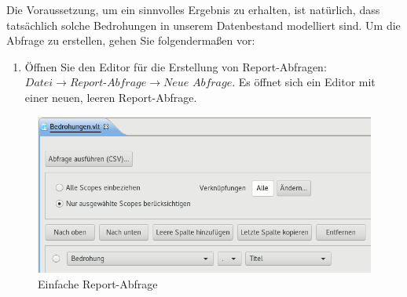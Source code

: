 \documentclass[a4paper,10pt]{book}
\providecommand{\tightlist}{%
  \setlength{\itemsep}{0pt}\setlength{\parskip}{0pt}}
\begin{document}
Die Voraussetzung, um ein sinnvolles Ergebnis zu erhalten, ist natürlich, dass
tatsächlich solche Bedrohungen in unserem Datenbestand modelliert sind. Um die
Abfrage zu erstellen, gehen Sie folgendermaßen vor:

\begin{enumerate}
\def\labelenumi{\arabic{enumi}.}
\tightlist
\item
  Öffnen Sie den Editor für die Erstellung von Report-Abfragen:
  $\textit{Datei}\to\textit{Report-Abfrage}\to\textit{Neue Abfrage}$. Es öffnet
  sich ein Editor mit einer neuen, leeren Report-Abfrage.
\end{enumerate}

\begin{figure}[htb!]
  \centering
  \includegraphics[width=\linewidth]{Screenshot/query-editor-simple-de.png}
  \caption{Einfache Report-Abfrage}
  \label{fig:einfache-report-abfrage}
\end{figure}
\end{document}
